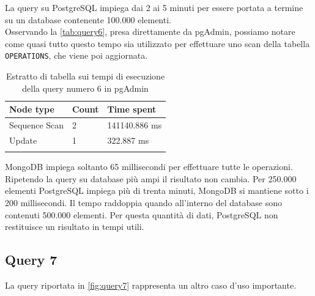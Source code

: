 \noindent La query su PostgreSQL impiega dai 2 ai 5 minuti per essere portata a termine su un database contenente 100.000 elementi.\\
Osservando la \autoref{tab:query6}, presa direttamente da pgAdmin, possiamo notare come quasi tutto questo tempo sia utilizzato per effettuare uno scan della tabella \texttt{OPERATIONS}, che viene poi aggiornata.\\

\begin{center} 
    \renewcommand{\arraystretch}{1.5}
    
    \centering
    \begin{longtable}{| C{2.5cm} | C{4cm} | C{4cm} |}
        
        \hline
        
        \textbf{Node type} & \textbf{Count} & \textbf{Time spent} \\
        
        \hline
        Sequence Scan & 2 & 141140.886 ms \\
        \hline 
        Update & 1 & 322.887 ms \\
        \hline
        
        \caption{Estratto di tabella sui tempi di esecuzione della query numero 6 in pgAdmin}
        \label{tab:query6}
    \end{longtable}
\end{center}

\noindent MongoDB impiega soltanto 65 millisecondi per effettuare tutte le operazioni.\\
Ripetendo la query su database più ampi il risultato non cambia. Per 250.000 elementi PostgreSQL impiega più di trenta minuti, MongoDB si mantiene sotto i 200 millisecondi. Il tempo raddoppia quando all'interno del database sono contenuti 500.000 elementi. Per questa quantità di dati, PostgreSQL non restituisce un risultato in tempi utili.\\


\subsection{Query 7}
La query riportata in \autoref{fig:query7} rappresenta un altro caso d'uso importante.

